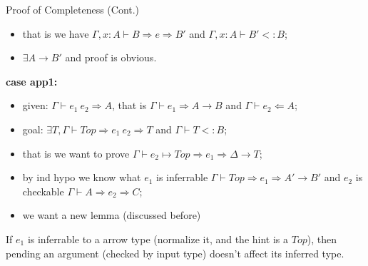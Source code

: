 \begin{frame}{Proof of Completeness (Cont.)}
	\begin{itemize}
		\item that is we have $\Gamma, x : A \vdash B \Rightarrow e \Rightarrow B'$ and $\Gamma, x : A \vdash B' <: B$;
		\item $\exists A \rightarrow B'$ and proof is obvious.
	\end{itemize}
\noindent\makebox[\linewidth]{\rule{0.9\paperwidth}{0.4pt}}
\textbf{case app1:}
\begin{itemize}
	\item given: $\Gamma \vdash e_1~e_2 \Rightarrow A$, that is $\Gamma \vdash e_1 \Rightarrow A \rightarrow B$ and $\Gamma \vdash e_2 \Leftarrow A$;
	\item goal: $\exists T, \Gamma \vdash Top \Rightarrow e_1~e_2 \Rightarrow T$ and $\Gamma \vdash T <: B$;
	\item that is we want to prove $\Gamma \vdash \boxed{e_2} \mapsto Top \Rightarrow e_1 \Rightarrow \Delta \rightarrow T$;
	\item  by ind hypo we know what $e_1$ is inferrable $\Gamma \vdash Top \Rightarrow e_1 \Rightarrow A' \rightarrow B'$ and $e_2$ is checkable $\Gamma \vdash A \Rightarrow e_2 \Rightarrow C$;
	\item we want a new lemma (discussed before)
\end{itemize}
\noindent\makebox[\linewidth]{\rule{0.9\paperwidth}{0.4pt}}
\begin{lemma}
If $e_1$ is inferrable to a arrow type (normalize it, and the hint is a $Top$), then pending an argument (checked by input type) doesn't affect its inferred type.
\end{lemma}

\end{frame}


